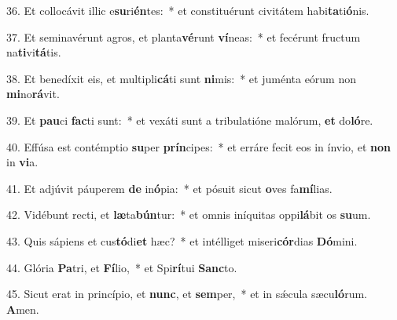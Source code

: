 36. Et collocávit illic e\textbf{su}ri\textbf{én}tes:~*  et constituérunt civitátem habi\textbf{ta}ti\textbf{ó}nis.\

37. Et seminavérunt agros, et planta\textbf{vé}runt \textbf{ví}neas:~*  et fecérunt fructum na\textbf{ti}vi\textbf{tá}tis.\

38. Et benedíxit eis, et multipli\textbf{cá}ti sunt \textbf{ni}mis:~*  et juménta eórum non \textbf{mi}no\textbf{rá}vit.\

39. Et \textbf{pau}ci \textbf{fac}ti sunt:~*  et vexáti sunt a tribulatióne malórum, \textbf{et} do\textbf{ló}re.\

40. Effúsa est contémptio \textbf{su}per \textbf{prín}cipes:~*  et erráre fecit eos in ínvio, et \textbf{non} in \textbf{vi}a.\

41. Et adjúvit páuperem \textbf{de} in\textbf{ó}pia:~*  et pósuit sicut \textbf{o}ves fa\textbf{mí}lias.\

42. Vidébunt recti, et \textbf{læ}ta\textbf{bún}tur:~*  et omnis iníquitas oppi\textbf{lá}bit os \textbf{su}um.\

43. Quis sápiens et cus\textbf{tó}di\textbf{et} hæc?~*  et intélliget miseri\textbf{cór}dias \textbf{Dó}mini.\

44. Glória \textbf{Pa}tri, et \textbf{Fí}lio,~*  et Spi\textbf{rí}tui \textbf{Sanc}to.\

45. Sicut erat in princípio, et \textbf{nunc}, et \textbf{sem}per,~*  et in sǽcula sæcu\textbf{ló}rum. \textbf{A}men.\


